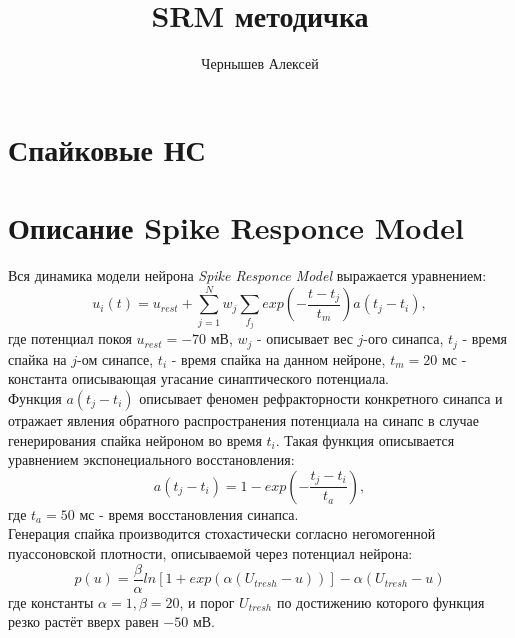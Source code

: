 \documentclass[a4paper,10pt]{article}
\title{SRM методичка}
\author{Чернышев Алексей}
\begin{document}
\section*{Спайковые НС}
\section*{Описание Spike Responce Model}
Вся динамика модели нейрона \textit{Spike Responce Model} выражается уравнением:
\begin{equation}\label{eq:u_srm}
u_{i}(t) = u_{rest} + \sum_{j=1}^N w_{j} \sum_{f_{j}} exp(-\frac{t-t_{j}}{t_{m}})a(t_{j}- t_{i}),
\end{equation}
где потенциал покоя $u_{rest} = -70$ мВ, $w_{j}$ - описывает вес $j$-ого синапса, $t_{j}$ - время спайка на $j$-ом синапсе, $t_{i}$ - время спайка на данном нейроне, $t_{m} = 20$ мс - константа описывающая угасание синаптического потенциала.\\ 
\indent Функция $a(t_{j}-t_{i})$ описывает феномен рефракторности конкретного синапса и отражает явления обратного распространения потенциала на синапс в случае генерирования спайка нейроном во время $t_{i}$. Такая функция описывается уравнением экспонециального восстановления:
\begin{equation}\label{eq:a}
a(t_{j}-t_{i})=1-exp(-\frac{t_{j}-t_{i}}{t_{a}}),
\end{equation}
где $t_{a} = 50$ мс - время восстановления синапса.\\
\indent Генерация спайка производится стохастически согласно негомогенной пуассоновской плотности, описываемой через потенциал нейрона:
\begin{equation}\label{eq:p_dens}
p(u)=\frac{\beta}{\alpha}ln[1+exp(\alpha(U_{tresh}-u))]-\alpha(U_{tresh}-u)
\end{equation}
где константы $\alpha=1,\beta=20$, и порог $U_{tresh}$ по достижению которого функция резко растёт вверх равен $-50$ мВ.
\end{document}
